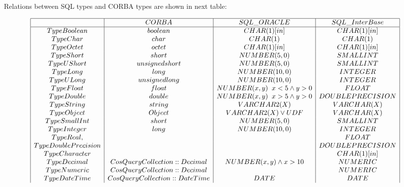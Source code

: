 \documentclass[10pt]{article}
\begin{document}
  Relations between SQL types and CORBA types are shown in next table:

\begin{footnotesize}
  $$
   \begin{array}{|c|c|c|c|}  \hline
                 &  CORBA  & SQL\_ORACLE                        & SQL\_InterBase \\ \hline
     TypeBoolean & boolean & CHAR(1) [in]                       & CHAR(1) [in] \\
     TypeChar    & char    & CHAR(1)                            & CHAR(1) \\
     TypeOctet   & octet   & CHAR(1) [in]                       & CHAR(1) [in]  \\
     TypeShort   & short   & NUMBER(5,0)                        & SMALLINT  \\
     TypeUShort  & unsigned short  & NUMBER(5,0)                & SMALLINT\\
     TypeLong    & long    & NUMBER(10,0)                       & INTEGER  \\
     TypeULong   & unsigned long & NUMBER(10,0)                 & INTEGER \\
     TypeFloat   & float  &  NUMBER(x,y) \;\; x < 5 \land y > 0 & FLOAT \\
     TypeDouble  & double &  NUMBER(x,y) \;\; x>5 \land y > 0   & DOUBLE PRECISION \\
     TypeString  & string & VARCHAR2(X)                       & VARCHAR(X) \\
     TypeObject  & Object & VARCHAR2(X) \lor UDF              & VARCHAR(X) \\
     TypeSmallInt & short & NUMBER(5,0)                       & SMALLINT \\
     TypeInteger  & long & NUMBER(10,0)                       & INTEGER \\
     TypeReal,   &  &                                        & FLOAT \\
     TypeDoublePrecision &  &                                & DOUBLE PRECISION \\
     TypeCharacter &  &                                       & CHAR(1) [in] \\
     TypeDecimal & CosQueryCollection::Decimal & NUMBER(x,y) \land x > 10   & NUMERIC \\
     TypeNumeric & CosQueryCollection::Decimal &                           & NUMERIC \\
     TypeDateTime & CosQueryCollection::DateTime & DATE & DATE\\

\end{array}$$
\end{footnotesize}
\end{document}
